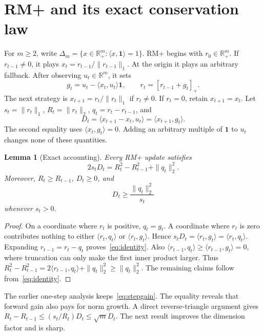 \documentclass{article}
\newtheorem{lemma}[theorem]{Lemma}
\newcommand{\one}{\mathbf 1}
\newcommand{\pos}[1]{\left[#1\right]_+}
\begin{document}
\section{RM+ and its exact conservation law}
\label{sec:identity}

For $m\ge2$, write $\Delta_m=\{x\in\mathbb R_+^m:\langle x,\one\rangle=1\}$. RM+ begins with $r_0\in\mathbb R_+^m$. If $r_{t-1}\ne0$, it plays $x_t=r_{t-1}/\|r_{t-1}\|_1$. At the origin it plays an arbitrary fallback. After observing $u_t\in\mathbb R^m$, it sets
\begin{equation}
g_t=u_t-\langle x_t,u_t\rangle\one,
\qquad
r_t=\pos{r_{t-1}+g_t}.
\label{eq:update}
\end{equation}
The next strategy is $x_{t+1}=r_t/\|r_t\|_1$ if $r_t\ne0$. If $r_t=0$, retain $x_{t+1}=x_t$. Let $s_t=\|r_t\|_1$, $R_t=\|r_t\|_2$, $q_t=r_t-r_{t-1}$, and
\begin{equation}
D_t=\langle x_{t+1}-x_t,u_t\rangle=\langle x_{t+1},g_t\rangle.
\label{eq:forward}
\end{equation}
The second equality uses $\langle x_t,g_t\rangle=0$. Adding an arbitrary multiple of $\one$ to $u_t$ changes none of these quantities.

\begin{lemma}[Exact accounting]
\label{lem:identity}
Every RM+ update satisfies
\begin{equation}
2s_tD_t=R_t^2-R_{t-1}^2+\|q_t\|_2^2.
\label{eq:identity}
\end{equation}
Moreover, $R_t\ge R_{t-1}$, $D_t\ge0$, and
\begin{equation}
D_t\ge \frac{\|q_t\|_2^2}{s_t}
\label{eq:stepgain}
\end{equation}
whenever $s_t>0$.
\end{lemma}

\begin{proof}
On a coordinate where $r_t$ is positive, $q_t=g_t$. A coordinate where $r_t$ is zero contributes nothing to either $\langle r_t,q_t\rangle$ or $\langle r_t,g_t\rangle$. Hence $s_tD_t=\langle r_t,g_t\rangle=\langle r_t,q_t\rangle$. Expanding $r_{t-1}=r_t-q_t$ proves~\eqref{eq:identity}. Also $\langle r_{t-1},q_t\rangle\ge\langle r_{t-1},g_t\rangle=0$, where truncation can only make the first inner product larger. Thus $R_t^2-R_{t-1}^2=2\langle r_{t-1},q_t\rangle+\|q_t\|_2^2\ge\|q_t\|_2^2$. The remaining claims follow from~\eqref{eq:identity}.
\end{proof}

The earlier one-step analysis keeps~\eqref{eq:stepgain}. The equality reveals that forward gain also pays for norm growth. A direct reverse-triangle argument gives $R_t-R_{t-1}\le(s_t/R_t)D_t\le\sqrt mD_t$. The next result improves the dimension factor and is sharp.
\end{document}
